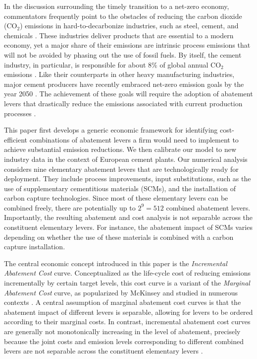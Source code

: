 \documentclass[12pt, a4paper]{article} %
\begin{document}
In the discussion surrounding the timely transition to a net-zero economy, commentators frequently point to the obstacles of reducing the carbon dioxide (CO$_2$) emissions in hard-to-decarbonize industries, such as steel, cement, and chemicals \citep{davis2018net,habert2020environmental,ahman2017global}. These industries deliver products that are essential to a modern economy, yet a major share of their emissions are intrinsic process emissions that will not be avoided by phasing out the use of fossil fuels. By itself, the cement industry, in particular, is responsible for about 8\% of global annual CO$_2$ emissions \citep{fennell2021decarbonizing,iea2018technology,cao2020the}. Like their counterparts in other heavy manufacturing industries, major cement producers have recently embraced net-zero emission goals by the year 2050 \citep{pca2022roadmap,cembureau2020cementing}. The achievement of these goals will require the adoption of abatement levers that drastically reduce the emissions associated with current production processes \citep{griffiths2023decarbonizing,clarke2021active,napp2014a,shen2017cement}.

This paper first develops a generic economic framework for identifying cost-efficient combinations of abatement levers a firm would need to implement to achieve substantial emission reductions. We then calibrate our model to new industry data \citep{ecra2022state} in the context of European cement plants. Our numerical analysis considers nine elementary abatement levers that are technologically ready for deployment. They include process improvements, input substitutions, such as the use of supplementary cementitious materials (SCMs), and the installation of carbon capture technologies. Since most of these elementary levers can be combined freely, there are potentially up to $2^9=512$ combined abatement levers. Importantly, the resulting abatement and cost analysis is not separable across the constituent elementary levers. For instance, the abatement impact of SCMs varies depending on whether the use of these materials is combined with a carbon capture installation.

The central economic concept introduced in this paper is the \emph{Incremental Abatement Cost} curve. Conceptualized as the life-cycle cost of reducing emissions incrementally by certain target levels, this cost curve is a variant of the \emph{Marginal Abatement Cost} curve, as popularized by McKinsey \citep{mckinsey2007a} and studied in numerous contexts \citep{harmsen2019long,jiang2020the,huang2016the,lameh2022on,misconel2022model}. A central assumption of marginal abatement cost curves is that the abatement impact of different levers is separable, allowing for levers to be ordered according to their marginal costs. In contrast, incremental abatement cost curves are generally not monotonically increasing in the level of abatement, precisely because the joint costs and emission levels corresponding to different combined levers are not separable across the constituent elementary levers \citep{kesicki2012marginal,Vogt-Schilb2014marginal,mckitrick1999a,ward2014the}.
\end{document}
